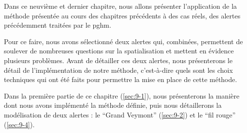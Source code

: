 Dans ce neuvième et dernier chapitre, nous allons présenter
l'application de la méthode présentée au cours des chapitres
précédents à des cas réels, des alertes précédemment traitées par le
\ac{pghm}.

Pour ce faire, nous avons sélectionné deux alertes qui, combinées,
permettent de soulever de nombreuses questions sur la spatialisation
et mettent en évidence plusieurs problèmes. Avant de détailler ces
deux alertes, nous présenterons le détail de l'implémentation de notre
méthode, c'est-à-dire quels sont les choix techniques qui ont été
faits pour permettre la mise en place de cette méthode.

Dans la première partie de ce chapitre (\autoref{sec:9-1}), nous
présenterons la manière dont nous avons implémenté la méthode définie,
puis nous détaillerons la modélisation de deux alertes : le
\enquote{Grand Veymont} (\autoref{sec:9-2}) et le \enquote{fil rouge}
(\autoref{sec:9-4}).

